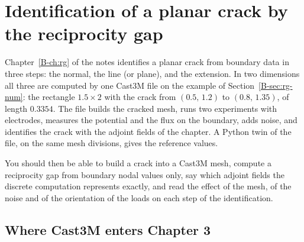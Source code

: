 \chapter{Identification of a planar crack by the reciprocity gap}\label{cc:ch3}


Chapter~\ref{B-ch:rg} of the notes identifies a planar crack from boundary
data in three steps: the normal, the line (or plane), and the extension. In
two dimensions all three are computed by one Cast3M file on the example of
Section~\ref{B-sec:rg-num}: the rectangle $1.5\times2$ with the crack from
$(0.5,\,1.2)$ to $(0.8,\,1.35)$, of length $0.3354$. The file builds the cracked
mesh, runs two experiments with electrodes, measures the potential and the flux
on the boundary, adds noise, and identifies the crack with the adjoint fields of
the chapter. A Python twin of the file, on the same mesh divisions, gives the
reference values.

You should then be able to build a crack into a Cast3M mesh, compute a
reciprocity gap from boundary nodal values only, say which adjoint fields the
discrete computation represents exactly, and read the effect of the mesh, of
the noise and of the orientation of the loads on each step of the
identification.

\section{Where Cast3M enters Chapter 3}\label{cc:sec3-map}
%

